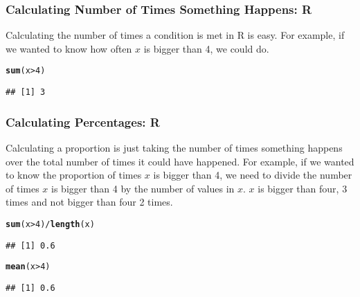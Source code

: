 \documentclass[11pt,containsverbatim,handout]{beamer}
\makeatletter
\newcommand{\hlnum}[1]{\textcolor[rgb]{0.686,0.059,0.569}{#1}}%
\newcommand{\hlopt}[1]{\textcolor[rgb]{0,0,0}{#1}}%
\newcommand{\hlstd}[1]{\textcolor[rgb]{0.345,0.345,0.345}{#1}}%
\newcommand{\hlkwd}[1]{\textcolor[rgb]{0.737,0.353,0.396}{\textbf{#1}}}%
\newenvironment{kframe}{%
 \def\at@end@of@kframe{}%
 \ifinner\ifhmode%
  \def\at@end@of@kframe{\end{minipage}}%
  \begin{minipage}{\columnwidth}%
 \fi\fi%
 \def\FrameCommand##1{\hskip\@totalleftmargin \hskip-\fboxsep
 \colorbox{shadecolor}{##1}\hskip-\fboxsep
     \hskip-\linewidth \hskip-\@totalleftmargin \hskip\columnwidth}%
 \MakeFramed {\advance\hsize-\width
   \@totalleftmargin\z@ \linewidth\hsize
   \@setminipage}}%
 {\par\unskip\endMakeFramed%
 \at@end@of@kframe}
\newenvironment{knitrout}{}{} %
\makeatother
\begin{document}
\begin{frame}[fragile]

\frametitle{Calculating Number of Times Something Happens: R}

Calculating the number of times a condition is met in R is easy.  For example, if we wanted to know how often $x$ is bigger than 4, we could do.  
\begin{knitrout}
\color{fgcolor}\begin{kframe}
\begin{alltt}
\hlkwd{sum}\hlstd{(x} \hlopt{>} \hlnum{4}\hlstd{)}
\end{alltt}
\begin{verbatim}
## [1] 3
\end{verbatim}
\end{kframe}
\end{knitrout}

\end{frame}

\begin{frame}[fragile]

\frametitle{Calculating Percentages: R}

Calculating a proportion is just taking the number of times something happens over the total number of times it could have happened.  For example, if we wanted to know the proportion of times $x$ is bigger than 4, we need to divide the number of times $x$ is bigger than 4 by the number of values in $x$.  $x$ is bigger than four, 3 times and not bigger than four 2 times.  
\begin{knitrout}
\color{fgcolor}\begin{kframe}
\begin{alltt}
\hlkwd{sum}\hlstd{(x} \hlopt{>} \hlnum{4}\hlstd{)}\hlopt{/}\hlkwd{length}\hlstd{(x)}
\end{alltt}
\begin{verbatim}
## [1] 0.6
\end{verbatim}
\begin{alltt}
\hlkwd{mean}\hlstd{(x} \hlopt{>} \hlnum{4}\hlstd{)}
\end{alltt}
\begin{verbatim}
## [1] 0.6
\end{verbatim}
\end{kframe}
\end{knitrout}

\end{frame}




\end{document}
